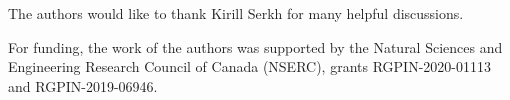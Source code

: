 \documentclass[../paper.tex]{subfiles}
\begin{document}
The authors would like to thank Kirill Serkh for many helpful discussions. 

For funding, the work of the authors was supported by the Natural Sciences and Engineering Research Council of Canada (NSERC), grants RGPIN-2020-01113 and RGPIN-2019-06946.
\end{document}
